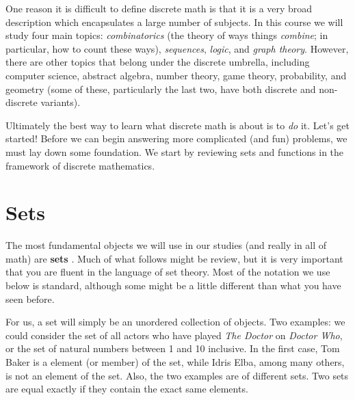 \documentclass[10pt,]{book}
\newcommand{\terminology}[1]{\textbf{#1}}
\theoremstyle{plain}
\theoremstyle{definition}
\theoremstyle{definition}
\theoremstyle{definition}
\begin{document}
    One reason it is difficult to define discrete math is that it is a very broad description which encapsulates a large number of subjects. In this course we will study four main topics: \emph{combinatorics} (the theory of ways things \emph{combine};
    in particular, how to count these ways), \emph{sequences}, \emph{logic}, and \emph{graph theory}. However, there are other topics that belong under the discrete umbrella, including computer science, abstract algebra, number theory, game theory,
    probability, and geometry (some of these, particularly the last two, have both discrete and non-discrete variants).
\par

    Ultimately the best way to learn what discrete math is about is to \emph{do} it. Let's get started! Before we can begin answering more complicated (and fun) problems, we must lay down some foundation. We start by reviewing sets and functions in
    the framework of discrete mathematics.
\typeout{************************************************}
\typeout{************************************************}
\section[Sets]{Sets}\label{sec_intro-sets}
\typeout{************************************************}
\typeout{************************************************}

      The most fundamental objects we will use in our studies (and really in all of math) are
      \terminology{sets}
      . Much of what follows might be review, but it is very important that you are fluent in the language of set theory. Most of the notation we use below is standard, although some might be a little different than what you have seen before.
\par

      For us, a set will simply be an unordered collection of objects. Two examples: we could consider the set of all actors who have played \emph{The Doctor} on \emph{Doctor Who}, or the
      set of natural numbers between 1 and 10 inclusive. In the first case, Tom Baker is a element (or member) of the set, while Idris Elba, among many others, is not an element of the set. Also, the two examples are of different sets. Two sets are equal
      exactly if they contain the exact same elements.
\typeout{************************************************}
\typeout{************************************************}
\end{document}
